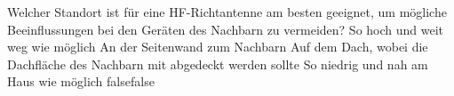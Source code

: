     {Welcher Standort ist für eine HF-Richtantenne am besten geeignet, um mögliche Beeinflussungen bei den Geräten des Nachbarn zu vermeiden?}
    {So hoch und weit weg wie möglich}
    {An der Seitenwand zum Nachbarn}
    {Auf dem Dach, wobei die Dachfläche des Nachbarn mit abgedeckt werden sollte}
    {So niedrig und nah am Haus wie möglich}
    {false}{false}
